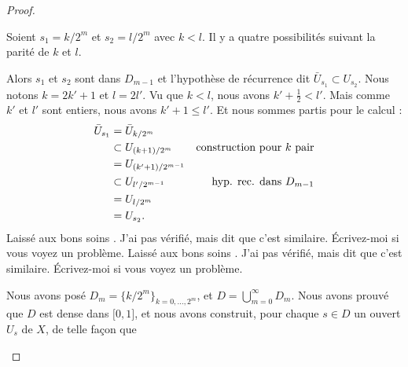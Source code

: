 \begin{proof}
\begin{subproof}
		Soient \( s_1=k/2^m\) et \( s_2=l/2^m\) avec \( k<l\). Il y a quatre possibilités suivant la parité de \( k\) et \( l\).
		\begin{subproof}
			Alors \( s_1\) et \( s_2\) sont dans \( D_{m-1}\) et l'hypothèse de récurrence dit \( \bar U_{s_1}\subset U_{s_2}\).
			Nous notons \( k=2k'+1\) et \( l=2l'\). Vu que \( k<l\), nous avons $k'+\frac{ 1 }{2}<l'$. Mais comme \( k'\) et \( l'\) sont entiers, nous avons \( k'+1\leq l'\). Et nous sommes partis pour le calcul :
			\begin{subequations}
				\begin{align}
					\bar U_{s_1} & =\bar U_{k/2^m}                                                \\
					             & \subset U_{(k+1)/2^m}  & \text{construction pour \( k \) pair} \\
					             & =U_{(k'+1)/2^{m-1}}                                            \\
					             & \subset U_{l'/2^{m-1}} & \text{hyp. rec. dans \( D_{m-1}\)}    \\
					             & =U_{l/2^m}                                                     \\
					             & =U_{s_2}.
				\end{align}
			\end{subequations}
			Laissé aux bons soins . J'ai pas vérifié, mais \cite{BIBooQKARooMHqitK} dit que c'est similaire. Écrivez-moi si vous voyez un problème.
			Laissé aux bons soins . J'ai pas vérifié, mais \cite{BIBooQKARooMHqitK} dit que c'est similaire. Écrivez-moi si vous voyez un problème.
		\end{subproof}
		\spitem[Résumé]
		Nous avons posé \( D_m=\{ k/2^m \}_{k=0,\ldots, 2^m}\), et \( D=\bigcup_{m=0}^{\infty}D_m\). Nous avons prouvé que \( D\) est dense dans \( \mathopen[ 0 , 1 \mathclose]\), et nous avons construit, pour chaque \( s\in D\) un ouvert \( U_s\) de \( X\), de telle façon que

\end{subproof}
\end{proof}
